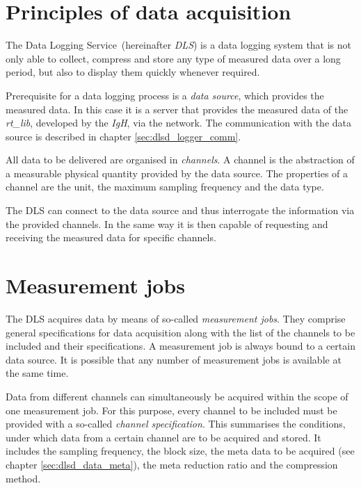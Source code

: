 \documentclass[a4paper,12pt,BCOR6mm,bibtotoc,idxtotoc]{scrbook}
\begin{document}
\section{Principles of data acquisition} \label{sec:allg_grund}

The \glqq Data Logging Service\grqq\ (hereinafter
\textit{DLS}) is a data logging system that is not only
able to collect, compress and store any type of measured data over a long period, but also to display them quickly whenever required.

Prerequisite for a data logging process is a \textit{data source}, which provides the measured data. In this case it is a server that provides the measured data of the \textit{rt\_lib}, developed by the \textit{IgH}, via the network. The communication with the data source is described in chapter \ref{sec:dlsd_logger_comm}.

All data to be delivered are organised in \textit{channels}. A channel is the abstraction of a measurable physical quantity provided by the data source. The properties of a channel are the unit, the maximum sampling frequency and the data type.

The DLS can connect to the data source and thus interrogate the information via the provided channels. In the same way it is then capable of requesting and receiving the measured data for specific channels.


\section{Measurement jobs} \label{sec:allg_jobs}

The DLS acquires data by means of so-called \textit{measurement jobs}. They comprise general specifications for data acquisition along with the list of the channels to be included and their specifications. A measurement job is always bound to a certain data source. It is possible that any number of measurement jobs is available at the same time.

Data from different channels can simultaneously be acquired within the scope of one measurement job. For this purpose, every channel to be included must be provided with a so-called \textit{channel specification}. This summarises the conditions, under which data from a certain channel are to be acquired and stored. It includes the sampling frequency, the block size, the meta data to be acquired (see chapter \ref{sec:dlsd_data_meta}), the meta reduction ratio and the compression method.
\end{document}
